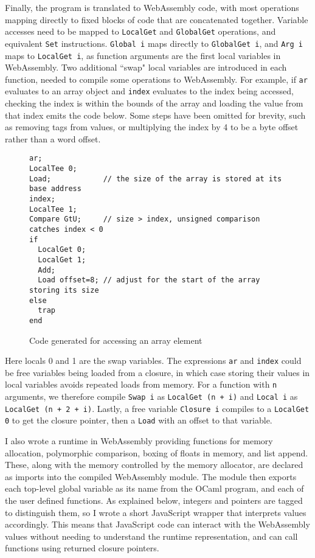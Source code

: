 Finally, the program is translated to WebAssembly code, with most operations mapping directly to fixed blocks of code that are concatenated together. Variable accesses need to be mapped to \verb|LocalGet| and \verb|GlobalGet| operations, and equivalent \verb|Set| instructions. \verb|Global i| maps directly to \verb|GlobalGet i|, and \verb|Arg i| maps to \verb|LocalGet i|, as function arguments are the first local variables in WebAssembly. Two additional ``swap" local variables are introduced in each function, needed to compile some operations to WebAssembly. 
For example, if \verb|ar| evaluates to an array object and \verb|index| evaluates to the index being accessed, checking the index is within the bounds of the array and loading the value from that index emits the code below. Some steps have been omitted for brevity, such as removing tags from values, or multiplying the index by 4 to be a byte offset rather than a word offset.

\begin{figure}[H]
\begin{verbatim}
ar; 
LocalTee 0;
Load;            // the size of the array is stored at its base address
index; 
LocalTee 1; 
Compare GtU;     // size > index, unsigned comparison catches index < 0
if
  LocalGet 0;
  LocalGet 1;
  Add;
  Load offset=8; // adjust for the start of the array storing its size
else
  trap 
end
\end{verbatim}
\caption{Code generated for accessing an array element}
\end{figure}

Here locals 0 and 1 are the swap variables. The expressions \verb|ar| and \verb|index| could be free variables being loaded from a closure, in which case storing their values in local variables avoids repeated loads from memory. 
 For a function with \verb|n| arguments, we therefore compile \verb|Swap i| as \verb|LocalGet (n + i)| and \verb|Local i| as \verb|LocalGet (n + 2 + i)|. Lastly,  a free variable \verb|Closure i| compiles to a \verb|LocalGet 0| to get the closure pointer, then a \verb|Load| with an offset to that variable.



I also wrote a runtime in WebAssembly providing functions for memory allocation, polymorphic comparison, boxing of floats in memory, and list append. These, along with the memory controlled by the memory allocator, are declared as imports into the compiled WebAssembly module. The module then exports each top-level global variable as its name from the OCaml program, and each of the user defined functions. 
As explained below, integers and pointers are tagged to distinguish them, so I wrote a short JavaScript wrapper that interprets values accordingly. This means that JavaScript code can interact with the WebAssembly values without needing to understand the runtime representation, and can call functions using returned closure pointers.

